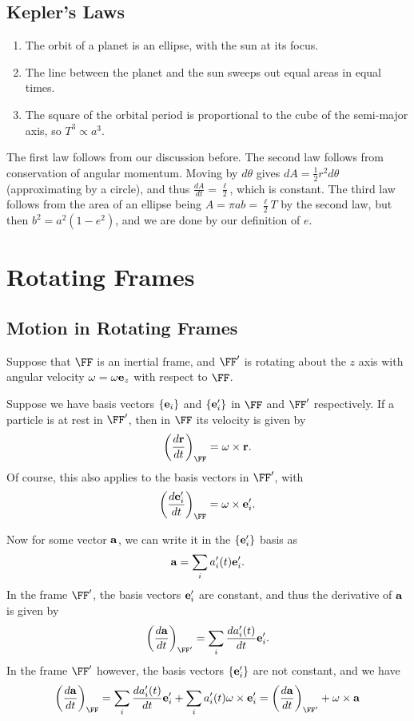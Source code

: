 \documentclass[a4paper]{scrartcl}
\begin{document}
\subsection{Kepler's Laws}

\begin{enumerate}
	\item The orbit of a planet is an ellipse, with the sun at its focus.
	\item The line between the planet and the sun sweeps out equal areas in equal times.
	\item The square of the orbital period is proportional to the cube of the semi-major axis, so $T^3 \propto a^3$.
\end{enumerate}

The first law follows from our discussion before. The second law follows from conservation of angular momentum. Moving by $d \theta$ gives $dA = \frac{1}{2}r^2 d \theta$ (approximating by a circle), and thus $\frac{dA}{dt} = \frac{\ell}{2}$, which is constant. The third law follows from the area of an ellipse being $A = \pi ab = \frac{\ell}{2}T$ by the second law, but then $b^2 = a^2(1 - e^2)$, and we are done by our definition of $e$.


%





\section{Rotating Frames}


\subsection{Motion in Rotating Frames}

Suppose that $\FF$ is an inertial frame, and $\FF'$ is rotating about the $z$ axis with angular velocity $\mathbf{\omega} = \omega \mathbf{e}_z$ with respect to $\FF$.

Suppose we have basis vectors $\{\mathbf{e}_i\}$ and $\{\mathbf{e}_i'\}$ in $\FF$ and $\FF'$ respectively. If a particle is at rest in $\FF'$, then in $\FF$ its velocity is given by
	$$
	\left(\frac{d \vv r}{d t}\right)_{\FF} = \vv \omega \times \vv r.
	$$
	Of course, this also applies to the basis vectors in $\FF'$, with
	$$
	\left(\frac{d \vv e_i'}{d t}\right)_{\FF} =\vv \omega \times \vv e_i'.
	$$

	Now for some vector $\mathbf{a}$, we can write it in the $\{\mathbf{e}_i'\}$ basis as
	$$
\mathbf{a} = \sum_i a_i'(t) \mathbf{e}_i'.
$$
In the frame $\FF'$, the basis vectors $\mathbf{e}_i'$ are constant, and thus the derivative of $\mathbf{a}$ is given by
$$
\left(\frac{d \vv a}{d t}\right)_{\FF'} = \sum_i \frac{d a_i'(t)}{dt} \vv{e}_i'.
$$
In the frame $\FF'$ however, the basis vectors $\{\mathbf{e}_i'\}$ are not constant, and we have
$$
\left(\frac{d \vv a}{d t}\right)_{\FF} = \sum_i \frac{d a_i'(t)}{dt} \vv{e}_i' + \sum_i a_i'(t) \vv \omega \times \vv e_i' = \left(\frac{d \vv a}{d t}\right)_{\FF'} +\vv \omega \times \vv a
$$
\end{document}
